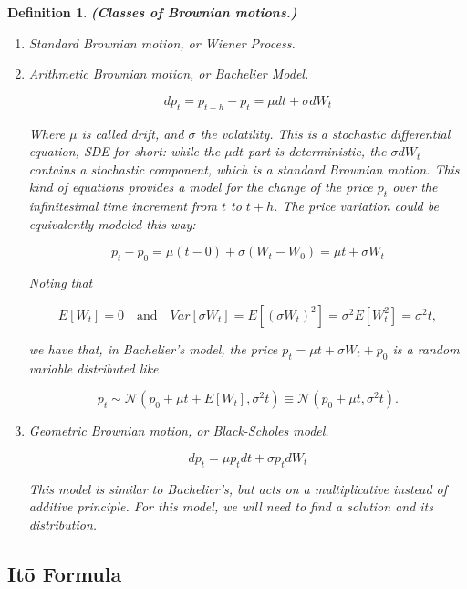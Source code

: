 \documentclass[oneside,titlepage,headinclude,12pt,a4paper,BCOR5mm,footinclude]{book}
\theoremstyle{defn}
\newtheorem{defn}{Definition}
\begin{document}
  \begin{defn}\textbf{(Classes of Brownian motions.)}

  \begin{enumerate}[label=(\Roman*)]
    \item \textit{Standard Brownian motion}, or \textit{Wiener Process}.
    \item \textit{Arithmetic Brownian motion}, or \textit{Bachelier Model}.
      
      \[
        dp_t = p_{t+h} - p_t = \mu dt + \sigma dW_t
      \]

      Where    $\mu$    is    called   \textit{drift},    and    $\sigma$    the
      \textit{volatility}. This is  a \textit{stochastic differential equation},
      \textit{SDE} for short: while the $\mu dt$ part is \textit{deterministic},
      the $\sigma  dW_t$ contains  a \textit{stochastic}  component, which  is a
      standard Brownian motion. This kind of  equations provides a model for the
      change of the  price $p_t$ over the infinitesimal time  increment from $t$
      to $t+h$. The price variation could be equivalently modeled this way:

      \[
        p_t - p_0 = \mu(t-0) + \sigma(W_t - W_0) = \mu t + \sigma W_t
      \]
      
      Noting that 

      \[ 
        E[W_t]  =  0
        \quad \text{and} \quad
        Var[\sigma W_t]  =  E[(\sigma W_t)^2]  = \sigma^2 E[W_t^2] =  \sigma^2 t,
      \]

      we have that, in Bachelier's model, the price  $p_t = \mu t + \sigma W_t +
      p_0$ is a \textit{random variable} distributed like

      \[
        p_t \sim \mathcal{N}(p_0 + \mu t + E[W_t], \sigma^2 t) \equiv
          \mathcal{N}(p_0 + \mu t, \sigma^2 t).
      \]

    \item \textit{Geometric Brownian motion}, or \textit{Black-Scholes model}.

      \[
        dp_t = \mu p_t dt + \sigma p_t dW_t
      \]

      This model is similar to Bachelier's, but acts on a multiplicative instead
      of additive principle. For this model, we will need to find a solution and
      its distribution.

  \end{enumerate}
  \end{defn}

  \subsection{It\=o Formula}
\end{document}
